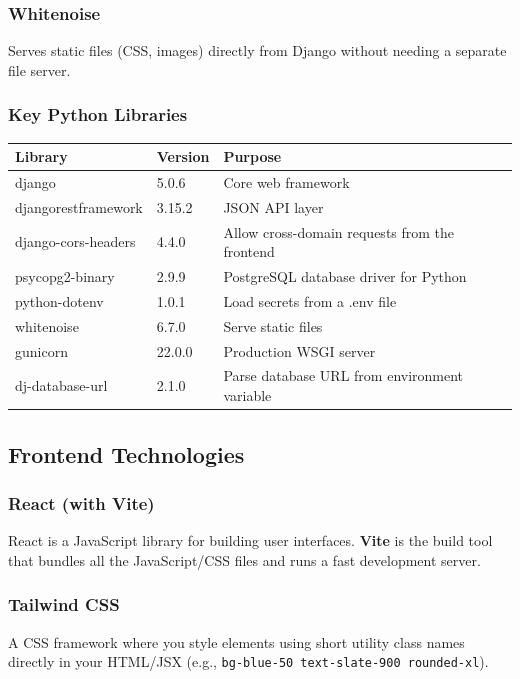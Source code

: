 \documentclass[12pt,a4paper]{article}
\begin{document}
\subsubsection{Whitenoise}
Serves static files (CSS, images) directly from Django without needing a separate file server.

\subsubsection{Key Python Libraries}
\begin{center}
\begin{tabularx}{\textwidth}{llX}
\toprule
\textbf{Library} & \textbf{Version} & \textbf{Purpose} \\
\midrule
django & 5.0.6 & Core web framework \\
djangorestframework & 3.15.2 & JSON API layer \\
django-cors-headers & 4.4.0 & Allow cross-domain requests from the frontend \\
psycopg2-binary & 2.9.9 & PostgreSQL database driver for Python \\
python-dotenv & 1.0.1 & Load secrets from a .env file \\
whitenoise & 6.7.0 & Serve static files \\
gunicorn & 22.0.0 & Production WSGI server \\
dj-database-url & 2.1.0 & Parse database URL from environment variable \\
\bottomrule
\end{tabularx}
\end{center}

\subsection{Frontend Technologies}

\subsubsection{React (with Vite)}
React is a JavaScript library for building user interfaces. \textbf{Vite} is the build tool that bundles all the JavaScript/CSS files and runs a fast development server.

\subsubsection{Tailwind CSS}
A CSS framework where you style elements using short utility class names directly in your HTML/JSX (e.g., \texttt{bg-blue-50 text-slate-900 rounded-xl}).
\end{document}
